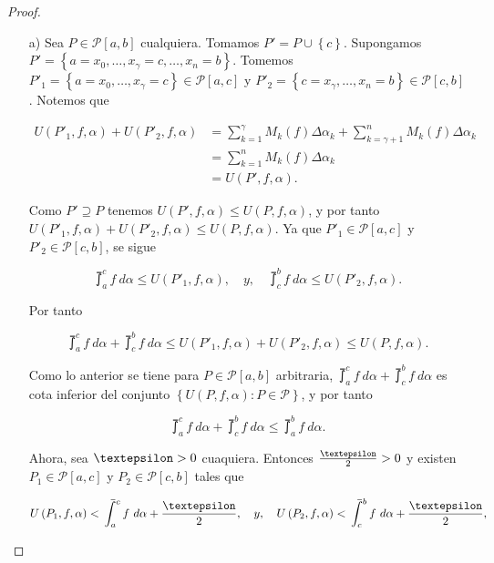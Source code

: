 \begin{proof}

\begin{itemize}
  \item[a)]Sea $P\in\mathcal{P}\left[a,b\right]$ cualquiera. Tomamos $P'=P\cup\left\lbrace c\right\rbrace$. Supongamos $P'=\left\lbrace a=x_0,\dots,x_\gamma=c,\dots,x_n=b\right\rbrace$. Tomemos $P'_1=\left\lbrace a=x_0,\dots,x_\gamma=c\right\rbrace\in\mathcal{P}\left[a,c\right]$ y $P'_2=\left\lbrace c=x_\gamma,\dots,x_n=b\right\rbrace\in\mathcal{P}\left[c,b\right]$. Notemos que

  \begin{align*}
  U\left(P'_1,f,\alpha\right)+U\left(P'_2,f,\alpha\right)&=\sum_{k=1}^{\gamma}M_k\left(f\right)\Delta\alpha_k+\sum_{k=\gamma+1}^{n}M_k\left(f\right)\Delta\alpha_k\\
  &=\sum_{k=1}^{n}M_k\left(f\right)\Delta\alpha_k\\
  &=U\left(P',f,\alpha\right).
  \end{align*}

Como $P'\supseteq P$ tenemos $U\left(P',f,\alpha\right)\leq U\left(P,f,\alpha\right)$, y por tanto $U\left(P'_1,f,\alpha\right)+U\left(P'_2,f,\alpha\right)\leq U\left(P,f,\alpha\right)$. Ya que $P'_1\in\mathcal{P}\left[a,c\right]$ y $P'_2\in\mathcal{P}\left[c,b\right]$, se sigue

\begin{equation*}
  \upint_a^c f\ d\alpha \leq U\left(P'_1,f,\alpha\right),\quad y,\quad \upint_c^b f\ d\alpha \leq U\left(P'_2,f,\alpha\right).
\end{equation*}

Por tanto

\begin{equation*}
  \upint_a^c f\ d\alpha + \upint_c^b f\ d\alpha \leq U\left(P'_1,f,\alpha\right)+U\left(P'_2,f,\alpha\right)\leq U\left(P,f,\alpha\right).
\end{equation*}

Como lo anterior se tiene para $P\in\mathcal{P}\left[a,b\right]$ arbitraria, $\upint_a^c f\ d\alpha + \upint_c^b f\ d\alpha$ es cota inferior del conjunto $\left\lbrace U\left(P,f,\alpha\right):P\in\mathcal{P}\right\rbrace$, y por tanto

\setcounter{equation}{0}
\begin{equation}
  \upint_a^c f\ d\alpha + \upint_c^b f\ d\alpha \leq \upint_a^b f\ d\alpha.
\end{equation}

Ahora, sea $\textepsilon>0$ cuaquiera. Entonces $\frac{\textepsilon}{2}>0$ y existen $P_1\in\mathcal{P}\left[a,c\right]$ y $P_2\in\mathcal{P}\left[c,b\right]$ tales que

\begin{equation*}
  U\left(P_1,f,\alpha\right)<\upint_a^c f\ d\alpha+\frac{\textepsilon}{2},\quad y,\quad U\left(P_2,f,\alpha\right)<\upint_c^b f\ d\alpha+\frac{\textepsilon}{2},
\end{equation*}

\end{itemize}

\end{proof}

